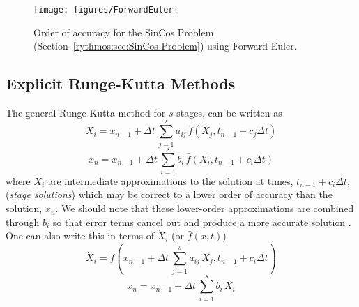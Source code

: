 \begin{figure}[H]
\centering{}\texttt{[image: figures/ForwardEuler]}\caption{Order of accuracy for the SinCos Problem (Section~\ref{rythmos:sec:SinCos-Problem})
using Forward Euler.\label{rythmos:fig:OrderofAccuracy-ForwardEuler}}
\end{figure}


\subsection{Explicit Runge-Kutta Methods\label{rythmos:sec:Explicit-Runge-Kutta-Methods}}

The general Runge-Kutta method for $s$-stages, can be written as
\[
X_{i}=x_{n-1}+\Delta t\,\sum_{j=1}^{s}a_{ij}\,\bar{f}(X_{j},t_{n-1}+c_{j}\Delta t)
\]
\[
x_{n}=x_{n-1}+\Delta t\,\sum_{i=1}^{s}b_{i}\,\bar{f}(X_{i},t_{n-1}+c_{i}\Delta t)
\]
where $X_{i}$ are intermediate approximations to the solution at
times, $t_{n-1}+c_{i}\Delta t$, (\emph{stage solutions}) which may
be correct to a lower order of accuracy than the solution, $x_{n}$.
We should note that these lower-order approximations are combined
through $b_{i}$ so that error terms cancel out and produce a more
accurate solution \cite[p. 80]{AscherPetzold}. One can also write
this in terms of $\dot{X}_{i}$ (or $\bar{f}(x,t)$)
\[
\dot{X}_{i}=\bar{f}\left(x_{n-1}+\Delta t\,\sum_{j=1}^{s}a_{ij}\,\dot{X}_{j},t_{n-1}+c_{i}\Delta t\right)
\]
\[
x_{n}=x_{n-1}+\Delta t\,\sum_{i=1}^{s}b_{i}\,\dot{X}_{i}
\]

